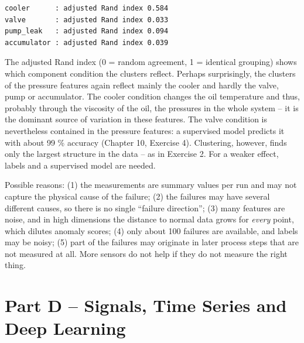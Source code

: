 \documentclass[
  letterpaper,
  DIV=11,
  numbers=noendperiod]{scrreprt}
\begin{document}
\begin{tcolorbox}
\begin{verbatim}
cooler      : adjusted Rand index 0.584
valve       : adjusted Rand index 0.033
pump_leak   : adjusted Rand index 0.094
accumulator : adjusted Rand index 0.039
\end{verbatim}

The adjusted Rand index (0 = random agreement, 1 = identical grouping)
shows which component condition the clusters reflect. Perhaps
surprisingly, the clusters of the pressure features again reflect mainly
the cooler and hardly the valve, pump or accumulator. The cooler
condition changes the oil temperature and thus, probably through the
viscosity of the oil, the pressures in the whole system -- it is the
dominant source of variation in these features. The valve condition is
nevertheless contained in the pressure features: a supervised model
predicts it with about 99 \% accuracy (Chapter 10, Exercise 4).
Clustering, however, finds only the largest structure in the data -- as
in Exercise 2. For a weaker effect, labels and a supervised model are
needed.

\end{tcolorbox}

\begin{tcolorbox}[enhanced jigsaw, left=2mm, title=\textcolor{quarto-callout-caution-color}{\faFire}\hspace{0.5em}{Solution to Exercise 4}, opacityback=0, breakable, rightrule=.15mm, arc=.35mm, toptitle=1mm, colbacktitle=quarto-callout-caution-color!10!white, opacitybacktitle=0.6, coltitle=black, colframe=quarto-callout-caution-color-frame, bottomrule=.15mm, leftrule=.75mm, bottomtitle=1mm, titlerule=0mm, toprule=.15mm, colback=white]

Possible reasons: (1) the measurements are summary values per run and
may not capture the physical cause of the failure; (2) the failures may
have several different causes, so there is no single ``failure
direction''; (3) many features are noise, and in high dimensions the
distance to normal data grows for \emph{every} point, which dilutes
anomaly scores; (4) only about 100 failures are available, and labels
may be noisy; (5) part of the failures may originate in later process
steps that are not measured at all. More sensors do not help if they do
not measure the right thing.

\end{tcolorbox}

\part{Part D -- Signals, Time Series and Deep Learning}
\end{document}
